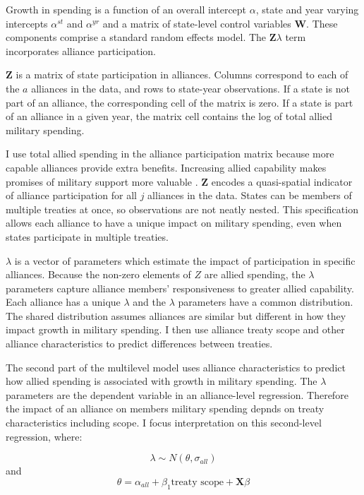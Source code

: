 \documentclass[12pt]{article}
\begin{document}
Growth in spending is a function of an overall intercept $\alpha$, state and year varying intercepts $\alpha^{st}$ and $\alpha^{yr}$ and a matrix of state-level control variables $\textbf{W}$.
These components comprise a standard random effects model. 
The $\textbf{Z} \lambda$ term incorporates alliance participation.


$\textbf{Z}$ is a matrix of state participation in alliances. 
Columns correspond to each of the $a$ alliances in the data, and rows to state-year observations. 
If a state is not part of an alliance, the corresponding cell of the matrix is zero.
If a state is part of an alliance in a given year, the matrix cell contains the log of total allied military spending.


I use total allied spending in the alliance participation matrix because more capable alliances provide extra benefits.
Increasing allied capability makes promises of military support more valuable \citep{Johnsonetal2015}.  
$\textbf{Z}$ encodes a quasi-spatial indicator of alliance participation for all $j$ alliances in the data. 
States can be members of multiple treaties at once, so observations are not neatly nested. 
This specification allows each alliance to have a unique impact on military spending, even when states participate in multiple treaties. 


$\lambda$ is a vector of parameters which estimate the impact of participation in specific alliances. 
Because the non-zero elements of $Z$ are allied spending, the $\lambda$ parameters capture alliance members' responsiveness to greater allied capability. 
Each alliance has a unique $\lambda$ and the $\lambda$ parameters have a common distribution. 
The shared distribution assumes alliances are similar but different in how they impact growth in military spending. 
I then use alliance treaty scope and other alliance characteristics to predict differences between treaties. 


The second part of the multilevel model uses alliance characteristics to predict how allied spending is associated with growth in military spending. 
The $\lambda$ parameters are the dependent variable in an alliance-level regression.
Therefore the impact of an alliance on members military spending depnds on treaty characteristics including scope. 
I focus interpretation on this second-level regression, where: 

\begin{equation}
\lambda \sim N(\theta, \sigma_{all})
\end{equation} 
and 
\begin{equation}
\theta = \alpha_{all} + \beta_1 \mbox{treaty scope} + \textbf{X} \beta
\end{equation}
\end{document}
